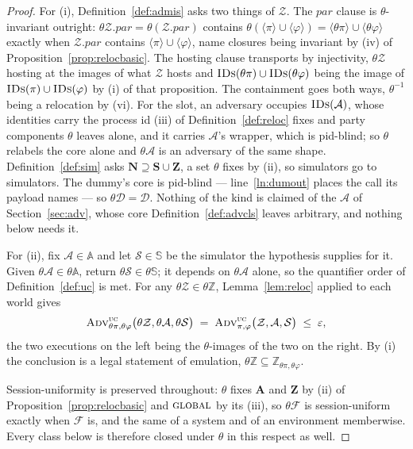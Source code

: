 \documentclass[11pt,a4paper]{article}
\newcommand{\admits}{\mathbf{N}}
\newcommand{\Apid}{\mathbf{A}}
\newcommand{\Zpid}{\mathbf{Z}}
\newcommand{\Spid}{\mathbf{S}}
\newcommand{\pars}{\mathit{par}}
\newcommand{\F}{\mathcal{F}}
\newcommand{\Zenv}{\mathcal{Z}}
\newcommand{\Adv}{\mathcal{A}}
\newcommand{\Dum}{\mathcal{D}}
\newcommand{\Sim}{\mathcal{S}}
\newcommand{\advtg}{\op{Adv}}
\newcommand{\Aset}{\mathbb{A}}
\newcommand{\SimSet}{\mathbb{S}}
\newcommand{\ZenvSet}{\mathbb{Z}}
\newcommand{\op}[1]{\textsc{#1}}
\newcommand{\IDs}{\op{IDs}}
\newcommand{\ncl}[1]{\langle #1 \rangle}
\theoremstyle{accentdef}
\theoremstyle{accentplain}
\begin{document}
\begin{proof}
For (i), Definition~\ref{def:admis} asks two things of $\Zenv$. The $\pars$ clause is
$\theta$-invariant outright: $\theta\Zenv.\pars = \theta(\Zenv.\pars)$ contains
$\theta(\ncl{\pi} \cup \ncl{\varphi}) = \ncl{\theta\pi} \cup \ncl{\theta\varphi}$ exactly when
$\Zenv.\pars$ contains $\ncl{\pi} \cup \ncl{\varphi}$, name closures being invariant by (iv) of
Proposition~\ref{prop:relocbasic}. The hosting clause transports by injectivity, $\theta\Zenv$
hosting at the images of what $\Zenv$ hosts and $\IDs(\theta\pi) \cup \IDs(\theta\varphi)$ being the
image of $\IDs(\pi) \cup \IDs(\varphi)$ by (i) of that proposition. The containment goes both ways,
$\theta^{-1}$ being a relocation by (vi). For
the slot, an adversary occupies $\IDs(\Adv)$, whose identities carry the process id (iii) of
Definition~\ref{def:reloc} fixes and party components $\theta$ leaves alone, and it carries $\Adv$'s
wrapper, which is pid-blind; so $\theta$ relabels the core alone and $\theta\Adv$ is an adversary of
the same shape. Definition~\ref{def:sim} asks $\admits \supseteq \Spid \cup \Zpid$, a set $\theta$
fixes by (ii), so simulators go to simulators. The dummy's core is pid-blind --- line~\ref{ln:dumout}
places the call its payload names --- so $\theta\Dum = \Dum$. Nothing of the kind is claimed of the
$\Adv$ of Section~\ref{sec:adv}, whose core Definition~\ref{def:advcls} leaves arbitrary, and nothing
below needs it.

For (ii), fix $\Adv \in \Aset$ and let $\Sim \in \SimSet$ be the simulator the hypothesis supplies
for it. Given $\theta\Adv \in \theta\Aset$, return $\theta\Sim \in \theta\SimSet$; it depends on
$\theta\Adv$ alone, so the quantifier order of Definition~\ref{def:uc} is met. For any
$\theta\Zenv \in \theta\ZenvSet$, Lemma~\ref{lem:reloc} applied to each world gives
\[
  \advtg^{\op{uc}}_{\theta\pi,\theta\varphi}\bigl(\theta\Zenv,\theta\Adv,\theta\Sim\bigr)
  \;=\;
  \advtg^{\op{uc}}_{\pi,\varphi}\bigl(\Zenv,\Adv,\Sim\bigr)
  \;\leq\; \varepsilon ,
\]
the two executions on the left being the $\theta$-images of the two on the right. By (i) the
conclusion is a legal statement of emulation, $\theta\ZenvSet \subseteq \ZenvSet_{\theta\pi,\theta\varphi}$.

Session-uniformity is preserved throughout: $\theta$ fixes $\Apid$ and $\Zpid$ by (ii) of
Proposition~\ref{prop:relocbasic} and $\op{global}$ by its (iii), so $\theta\F$ is session-uniform
exactly when $\F$ is, and the same of a system and of an environment memberwise. Every class below is
therefore closed under $\theta$ in this respect as well.


\end{proof}
\end{document}
